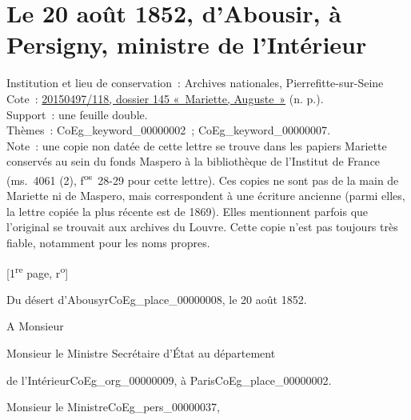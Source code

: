 \documentclass{book}
\begin{document}
\hypertarget{CoEg_Mariette_1852-08-20}{}
\section*{Le 20 août 1852, d’Abousir, à Persigny, ministre de l'Intérieur}
{\footnotesize \noindent Institution et lieu de conservation~: Archives nationales, Pierrefitte-sur-Seine\\
Cote~: \hyperlink{CoEg_Mariette_ms_001}{20150497/118, dossier 145 «~Mariette, Auguste~»} (n. p.).\\
Support~: une feuille double.\\
Thèmes~: \gls{CoEg_keyword_00000002}~; \gls{CoEg_keyword_00000007}.\\
Note~: une copie non datée de cette lettre se trouve dans les papiers Mariette conservés au sein du fonds Maspero à la bibliothèque de l’Institut de France (ms.~4061 (2), f\textsuperscript{os}~28-29 pour cette lettre). Ces copies ne sont pas de la main de Mariette ni de Maspero, mais correspondent à une écriture ancienne (parmi elles, la lettre copiée la plus récente est de 1869). Elles mentionnent parfois que l’original se trouvait aux archives du Louvre. Cette copie n’est pas toujours très fiable, notamment pour les noms propres.
\begin{center} [1\textsuperscript{re} page, r\textsuperscript{o}]
\end{center}}
\begin{flushright}
Du désert d’Abousyr\gls{CoEg_place_00000008}, le 20 août 1852.
\end{flushright}
\indent A Monsieur\\
\begin{center}Monsieur le Ministre Secrétaire d’État au département\end{center}
\begin{flushright}de l’Intérieur\gls{CoEg_org_00000009}, à Paris\gls{CoEg_place_00000002}.\end{flushright}

\hspace{1cm} Monsieur le Ministre\gls{CoEg_pers_00000037},\\
\end{document}
